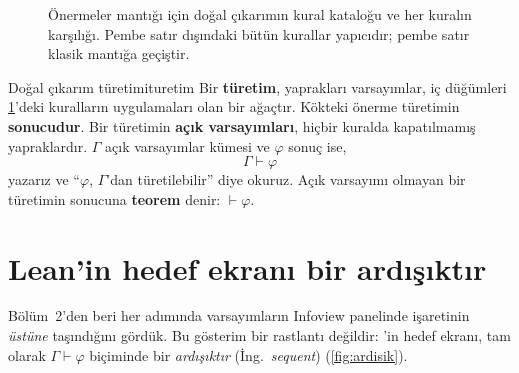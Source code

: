 \begin{figure}[p]
\vspace{6pt}
\caption{Önermeler mantığı için doğal çıkarımın kural kataloğu ve her
kuralın \Lean{} karşılığı. Pembe satır dışındaki bütün kurallar
yapıcıdır; pembe satır klasik mantığa geçiştir.}
\label{fig:kural-katalogu}
\end{figure}

\begin{tanim}{Doğal çıkarım türetimi}{turetim}
Bir \textbf{türetim}, yaprakları varsayımlar, iç düğümleri
\cref{fig:kural-katalogu}'deki kuralların uygulamaları olan bir
ağaçtır. Kökteki önerme türetimin \textbf{sonucudur}. Bir türetimin
\textbf{açık varsayımları}, hiçbir kuralda kapatılmamış yapraklardır.
$\Gamma$ açık varsayımlar kümesi ve $\varphi$ sonuç ise,
\[
  \Gamma \vdash \varphi
\]
yazarız ve ``$\varphi$, $\Gamma$'dan türetilebilir'' diye okuruz.
Açık varsayımı olmayan bir türetimin sonucuna \textbf{teorem} denir:
$\vdash \varphi$.
\end{tanim}

\section{Lean'in hedef ekranı bir ardışıktır}\label{sec:ardisik-gorunum}

Bölüm~2'den beri her  adımında varsayımların Infoview
panelinde  işaretinin \emph{üstüne} taşındığını gördük. Bu
gösterim bir rastlantı değildir: \Lean{}'in hedef ekranı, tam olarak
$\Gamma \vdash \varphi$ biçiminde bir \emph{ardışıktır} (İng.\
\emph{sequent}) (\cref{fig:ardisik}).

